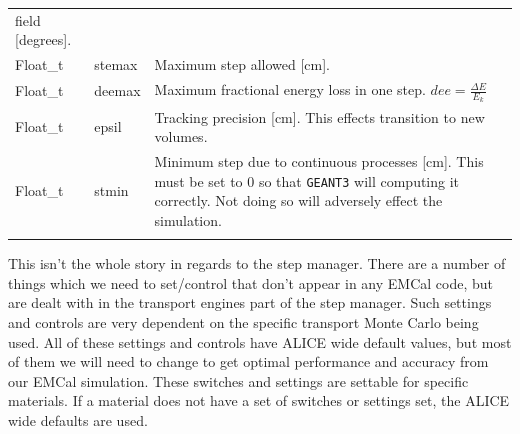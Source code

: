 \begin{longtable}{p{}p{}p{}}
                       field [degrees].\\
    Float\_t & stemax & Maximum step allowed [cm].\\
    Float\_t & deemax & Maximum fractional energy loss in one step.\newline
                       $dee=\frac{\Delta E}{E_{k}}$\\
    Float\_t & epsil  & Tracking precision [cm].\newline
                       This effects transition to new volumes.\\
    Float\_t & stmin  & Minimum step due to continuous processes [cm].\newline
                       This must be set to 0 so that \texttt{GEANT3} will
                       computing it correctly. Not doing so will adversely
                       effect the simulation.\\
   \normalsize
   \label{tab:MediumParameers}
\end{longtable}


This isn't the whole story in regards to the step manager. There
are a number of things which we need to set/control that don't
appear in any EMCal code, but are dealt with in the transport
engines part of the step manager. Such settings and controls
are very dependent on the specific transport Monte Carlo being
used. All of these settings and controls have ALICE wide
default values, but most of them we will need to change to
get optimal performance and accuracy from our EMCal simulation. 
These switches and
settings are settable for specific materials. If a material
does not have a set of switches or settings set, the ALICE
wide defaults are used.

